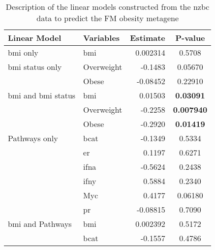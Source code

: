 	\begin{table}[htpb]
		\centering
		\caption{Description of the linear models constructed from the \gls{nzbc} data to predict the FM obesity metagene}
		\label{tab:lm_sig_var_fm}
		\begin{threeparttable}
			\begin{tabular}{llrc}
				Linear Model & Variables & Estimate & P-value\\
				\hline
				\hline
				\rule{0pt}{2.25ex}\gls{bmi} only                           & \gls{bmi}  & 0.002314 & 0.5708 \\
				\hline
				\rule{0pt}{2.25ex}\gls{bmi} status only                    & Overweight & -0.1483  & 0.05670 \\
                                                                           & Obese      & -0.08452 & 0.22910 \\
				\hline
				\rule{0pt}{2.25ex}\gls{bmi} and \gls{bmi} status           & \gls{bmi}  & 0.01503  & \bfseries 0.03091  \\
                                                                           & Overweight & -0.2258  & \bfseries 0.007940\\ 
                                                                           & Obese      & -0.2920  & \bfseries 0.01419  \\
				\hline
				\rule{0pt}{2.25ex}Pathways only                            & \gls{bcat} & -0.1349  & 0.5334  \\
                                                                           & \gls{er}   & 0.1197   & 0.6271  \\
                                                                           & \gls{ifna} & -0.5624  & 0.2438  \\
                                                                           & \gls{ifny} & 0.5884   & 0.2340  \\
                                                                           & Myc        & 0.4177   & 0.06180 \\
                                                                           & \gls{pr}   & -0.08815 & 0.7090  \\
				\hline
				\rule{0pt}{2.25ex}\gls{bmi} and Pathways                   & \gls{bmi}  & 0.002392 & 0.5172  \\
                                                                           & \gls{bcat} & -0.1557  & 0.4786  \\

\end{tabular}
\end{threeparttable}
\end{table}

